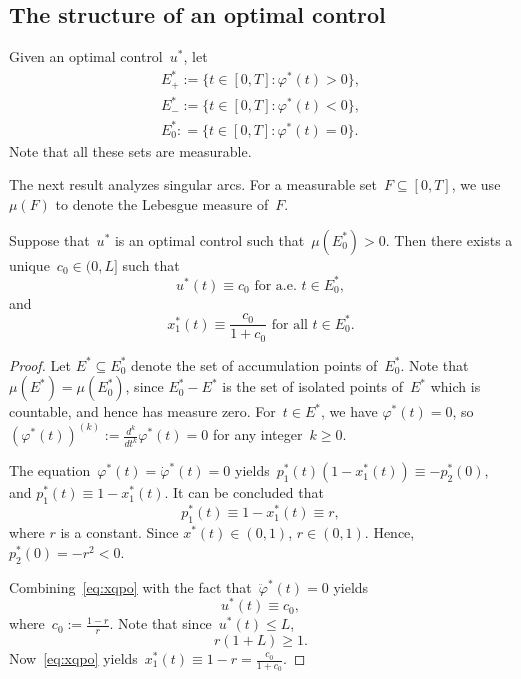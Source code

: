 \subsection{The structure of an optimal control}

Given an optimal control~$u^*$, let
\begin{subequations}
	\begin{align}
		E_+^* :=\{ t \in [0,T]:  \varphi^*(t)>0\} , \\
		E_-^* :=\{ t \in [0,T] : \varphi^*(t)<0\},\\
		E_0^* : =\{ t \in [0,T] :  \varphi^*(t)=0\}.
	\end{align}
\end{subequations}
Note that all these  sets are measurable.

The next result analyzes singular arcs. 
For a measurable set~$F\subseteq [0,T]$, we use~$\mu(F)$ to denote the  Lebesgue measure of~$F$. 

\begin{lemma}\label{lemma:singular}
	Suppose  that~$u^*$ is an optimal control such that~$\mu(E_0^*)>0$.
	Then there exists a unique~$c_0\in ( 0,L]$ such that 
	\begin{equation} \label{singular}
		u^*(t)   \equiv  c_0  
		\text{ for a.e. }   t\in E_0 ^*, 
	\end{equation}
	and 
	\begin{equation}
		x_1^*(t)\equiv  \frac{c_0}{1+c_0} \text{ for all }  t \in E_0^*.
	\end{equation}
\end{lemma}

\begin{proof}
	Let $E^* \subseteq E_0^*$ denote  the set of accumulation points of~$E_0^*$.
	Note that~$\mu(E^*)=\mu(E_0^*)$, since $E_0^*-E^*$ is the set of isolated points of~$E^*$ which is countable, and hence has measure zero. 
	For~$t\in E^*$, we have $\varphi^*(t)=0$, so~$(\varphi^*(t) )^{(k)}:= \frac{d^k}{dt^k} \varphi^*(t) =0$ for any integer~$k\geq 0$.
	
	The equation~$\varphi^*(t)=\dot\varphi^*(t)=0$ yields~$p_1^*(t) (1-x_1^*(t)) \equiv -p_2^*(0)$, and $p_1^*(t) \equiv 1-x_1^*(t)$. 
	It can be concluded that 
	\begin{equation} \label{eq:xqpo}
	p_1^*(t)\equiv 1-x_1^*(t) \equiv r , 
	\end{equation}
	where $r$ is a constant. Since $x^*(t)\in (0,1)$,  $r\in (0,1)$. 
	Hence, $p_2^*(0) = -r^2 <0$.
	
	Combining~\eqref{eq:xqpo} 
	with  the fact that~$\ddot\varphi^*(t)=0$ yields
	\begin{equation}
		u^*(t) \equiv c_0,
	\end{equation}
	where~$c_0:=\frac{1-r}{r} $. Note that since~$u^*(t)\leq L$, 
	\begin{equation} \label{eq:blr}
		r(1+L)\geq 1 .
	\end{equation}
	Now~\eqref{eq:xqpo}  yields~$x_1^*(t)\equiv 1-r=\frac{c_0}{1+c_0}$.
\end{proof}

